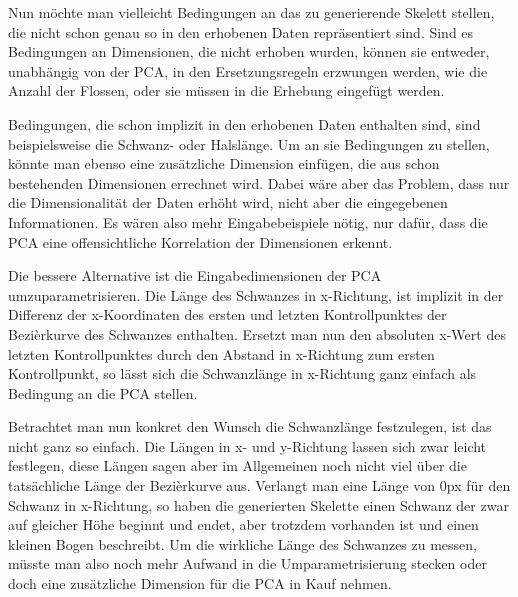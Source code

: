  Nun möchte man vielleicht Bedingungen an das zu generierende Skelett stellen, die nicht schon genau so in den erhobenen Daten repräsentiert sind. 
 Sind es Bedingungen an Dimensionen, die nicht erhoben wurden, können  sie entweder, unabhängig von der PCA, in den Ersetzungsregeln erzwungen werden, wie \zb die Anzahl der Flossen, oder sie müssen in die Erhebung eingefügt werden.
 
 Bedingungen, die schon implizit in den erhobenen Daten enthalten sind, sind beispielsweise die Schwanz- oder Halslänge. Um an sie Bedingungen zu stellen, könnte man ebenso eine zusätzliche Dimension einfügen, die aus schon bestehenden Dimensionen errechnet wird. Dabei wäre aber das Problem, dass nur die Dimensionalität der Daten erhöht wird, nicht aber die eingegebenen Informationen. Es wären also mehr Eingabebeispiele nötig, nur dafür, dass die PCA eine offensichtliche Korrelation der Dimensionen erkennt.
 
 Die bessere Alternative ist die Eingabedimensionen der PCA umzuparametrisieren. Die Länge des Schwanzes in x-Richtung, ist \zb implizit in der Differenz der x-Koordinaten des ersten und letzten Kontrollpunktes der Bezièrkurve des Schwanzes enthalten. Ersetzt man nun den absoluten x-Wert des letzten Kontrollpunktes durch den Abstand in x-Richtung zum ersten Kontrollpunkt, so lässt sich die Schwanzlänge in x-Richtung ganz einfach als Bedingung an die PCA stellen. 
 
 Betrachtet man nun konkret den Wunsch die Schwanzlänge festzulegen, ist das nicht ganz so einfach. Die Längen in x- und y-Richtung lassen sich zwar leicht festlegen, diese Längen sagen aber im Allgemeinen noch nicht viel über die tatsächliche Länge der Bezièrkurve aus. Verlangt man \zb eine Länge von $0$px für den Schwanz in x-Richtung, so haben die generierten Skelette einen Schwanz der zwar auf gleicher Höhe beginnt und endet, aber trotzdem vorhanden ist und einen kleinen Bogen beschreibt. 
 Um die wirkliche Länge des Schwanzes zu messen, müsste man also noch mehr Aufwand in die Umparametrisierung stecken oder doch eine zusätzliche Dimension für die PCA in Kauf nehmen.
 
 
